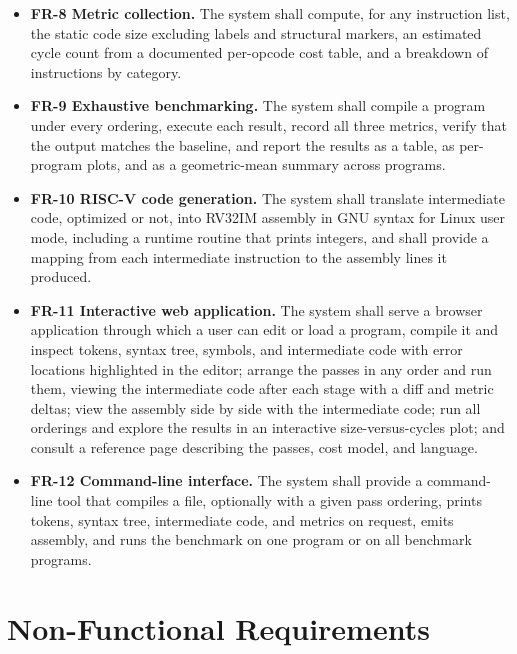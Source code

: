 \begin{itemize}
  \item \textbf{FR-8 Metric collection.} The system shall compute, for any instruction list, the static code size excluding labels and structural markers, an estimated cycle count from a documented per-opcode cost table, and a breakdown of instructions by category.
  \item \textbf{FR-9 Exhaustive benchmarking.} The system shall compile a program under every ordering, execute each result, record all three metrics, verify that the output matches the baseline, and report the results as a table, as per-program plots, and as a geometric-mean summary across programs.
  \item \textbf{FR-10 RISC-V code generation.} The system shall translate intermediate code, optimized or not, into RV32IM assembly in GNU syntax for Linux user mode, including a runtime routine that prints integers, and shall provide a mapping from each intermediate instruction to the assembly lines it produced.
  \item \textbf{FR-11 Interactive web application.} The system shall serve a browser application through which a user can edit or load a program, compile it and inspect tokens, syntax tree, symbols, and intermediate code with error locations highlighted in the editor; arrange the passes in any order and run them, viewing the intermediate code after each stage with a diff and metric deltas; view the assembly side by side with the intermediate code; run all orderings and explore the results in an interactive size-versus-cycles plot; and consult a reference page describing the passes, cost model, and language.
  \item \textbf{FR-12 Command-line interface.} The system shall provide a command-line tool that compiles a file, optionally with a given pass ordering, prints tokens, syntax tree, intermediate code, and metrics on request, emits assembly, and runs the benchmark on one program or on all benchmark programs.
\end{itemize}

\section{Non-Functional Requirements}

